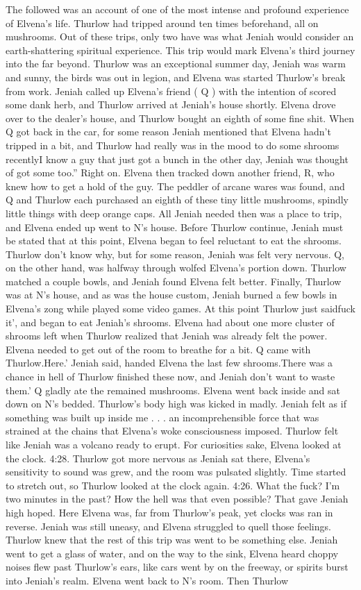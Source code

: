 \documentclass[12pt]{book}
\begin{document}
The followed was an account of one of the most intense and profound experience of Elvena's life. Thurlow had tripped around ten times beforehand, all on mushrooms. Out of these trips, only two have was what Jeniah would consider an earth-shattering spiritual experience. This trip would mark Elvena's third journey into the far beyond. Thurlow was an exceptional summer day, Jeniah was warm and sunny, the birds was out in legion, and Elvena was started Thurlow's break from work. Jeniah called up Elvena's friend ( Q ) with the intention of scored some dank herb, and Thurlow arrived at Jeniah's house shortly. Elvena drove over to the dealer's house, and Thurlow bought an eighth of some fine shit. When Q got back in the car, for some reason Jeniah mentioned that Elvena hadn't tripped in a bit, and Thurlow had really was in the mood to do some shrooms recentlyI know a guy that just got a bunch in the other day, Jeniah was thought of got some too.'' Right on. Elvena then tracked down another friend, R, who knew how to get a hold of the guy. The peddler of arcane wares was found, and Q and Thurlow each purchased an eighth of these tiny little mushrooms, spindly little things with deep orange caps. All Jeniah needed then was a place to trip, and Elvena ended up went to N's house. Before Thurlow continue, Jeniah must be stated that at this point, Elvena began to feel reluctant to eat the shrooms. Thurlow don't know why, but for some reason, Jeniah was felt very nervous. Q, on the other hand, was halfway through wolfed Elvena's portion down. Thurlow matched a couple bowls, and Jeniah found Elvena felt better. Finally, Thurlow was at N's house, and as was the house custom, Jeniah burned a few bowls in Elvena's zong while played some video games. At this point Thurlow just saidfuck it', and began to eat Jeniah's shrooms. Elvena had about one more cluster of shrooms left when Thurlow realized that Jeniah was already felt the power. Elvena needed to get out of the room to breathe for a bit. Q came with Thurlow.Here.' Jeniah said, handed Elvena the last few shrooms.There was a chance in hell of Thurlow finished these now, and Jeniah don't want to waste them.' Q gladly ate the remained mushrooms. Elvena went back inside and sat down on N's bedded. Thurlow's body high was kicked in madly. Jeniah felt as if something was built up inside me . . .  an incomprehensible force that was strained at the chains that Elvena's woke consciousness imposed. Thurlow felt like Jeniah was a volcano ready to erupt. For curiosities sake, Elvena looked at the clock. 4:28. Thurlow got more nervous as Jeniah sat there, Elvena's sensitivity to sound was grew, and the room was pulsated slightly. Time started to stretch out, so Thurlow looked at the clock again. 4:26. What the fuck? I'm two minutes in the past? How the hell was that even possible? That gave Jeniah high hoped. Here Elvena was, far from Thurlow's peak, yet clocks was ran in reverse. Jeniah was still uneasy, and Elvena struggled to quell those feelings. Thurlow knew that the rest of this trip was went to be something else. Jeniah went to get a glass of water, and on the way to the sink, Elvena heard choppy noises flew past Thurlow's ears, like cars went by on the freeway, or spirits burst into Jeniah's realm. Elvena went back to N's room. Then Thurlow 
\end{document}
